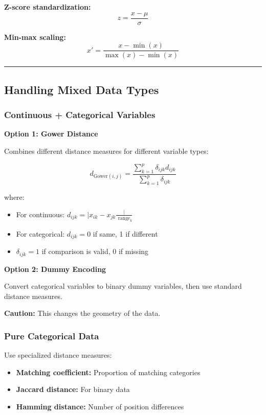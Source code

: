 \documentclass[
]{article}
\begin{document}
\textbf{Z-score standardization:} \[z = \frac{x - \mu}{\sigma}\]

\textbf{Min-max scaling:} \[x' = \frac{x - \min(x)}{\max(x) - \min(x)}\]

\begin{center}\rule{0.5\linewidth}{0.5pt}\end{center}

\textbf{ }

\subsection{Handling Mixed Data Types}

\subsubsection{Continuous + Categorical Variables}

\textbf{Option 1: Gower Distance}

Combines different distance measures for different variable types:

\[d_{\text{Gower}(i,j)} = \frac{\sum_{k = 1}^{p}\delta_{ijk}d_{ijk}}{\sum_{k = 1}^{p}\delta_{ijk}}\]

where:

\begin{itemize}
\item
  For continuous:
  \(d_{ijk} = |x_{ik} - x_{jk}\frac{|}{\text{ range}_{k}}\)
\item
  For categorical: \(d_{ijk} = 0\) if same, 1 if different
\item
  \(\delta_{ijk} = 1\) if comparison is valid, 0 if missing
\end{itemize}

\textbf{Option 2: Dummy Encoding}

Convert categorical variables to binary dummy variables, then use
standard distance measures.

\textbf{Caution:} This changes the geometry of the data.

\subsubsection{Pure Categorical Data}

Use specialized distance measures:

\begin{itemize}
\item
  \textbf{Matching coefficient:} Proportion of matching categories
\item
  \textbf{Jaccard distance:} For binary data
\item
  \textbf{Hamming distance:} Number of position differences
\end{itemize}
\end{document}
